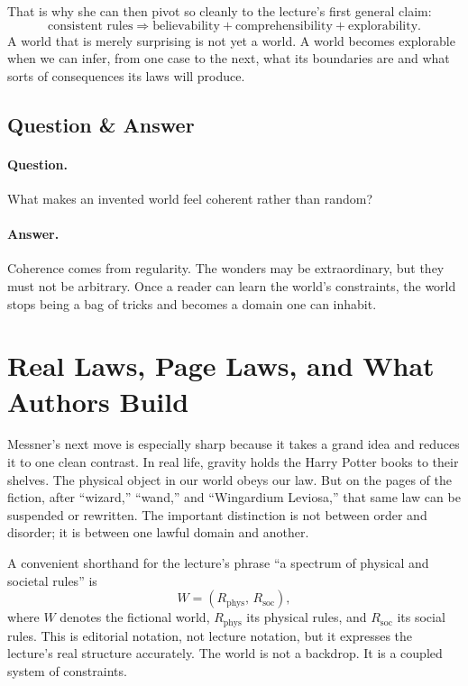 That is why she can then pivot so cleanly to the lecture's first general claim:
\begin{equation}
\text{consistent rules} \Rightarrow \text{believability} + \text{comprehensibility} + \text{explorability}.
\end{equation}
A world that is merely surprising is not yet a world. A world becomes explorable when we can infer, from one case to the next, what its boundaries are and what sorts of consequences its laws will produce.

\subsection{Question \& Answer}

\paragraph{Question.} What makes an invented world feel coherent rather than random?

\paragraph{Answer.} Coherence comes from regularity. The wonders may be extraordinary, but they must not be arbitrary. Once a reader can learn the world's constraints, the world stops being a bag of tricks and becomes a domain one can inhabit.

\section{Real Laws, Page Laws, and What Authors Build}

Messner's next move is especially sharp because it takes a grand idea and reduces it to one clean contrast. In real life, gravity holds the Harry Potter books to their shelves. The physical object in our world obeys our law. But on the pages of the fiction, after ``wizard,'' ``wand,'' and ``Wingardium Leviosa,'' that same law can be suspended or rewritten. The important distinction is not between order and disorder; it is between one lawful domain and another.

A convenient shorthand for the lecture's phrase ``a spectrum of physical and societal rules'' is
\begin{equation}
W = (R_{\mathrm{phys}},\,R_{\mathrm{soc}}),
\end{equation}
where \(W\) denotes the fictional world, \(R_{\mathrm{phys}}\) its physical rules, and \(R_{\mathrm{soc}}\) its social rules. This is editorial notation, not lecture notation, but it expresses the lecture's real structure accurately. The world is not a backdrop. It is a coupled system of constraints.

